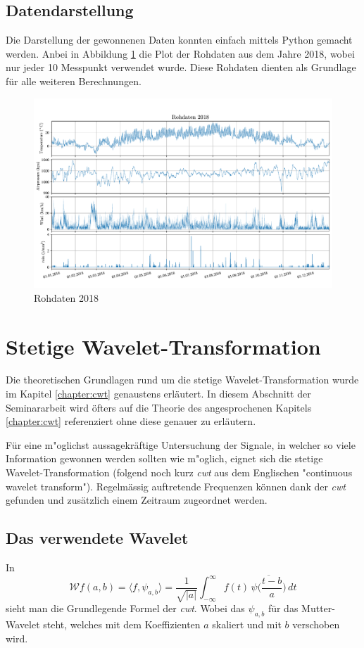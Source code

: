 \begin{refsection}
\subsection{Datendarstellung}
Die Darstellung der gewonnenen Daten konnten einfach mittels Python gemacht werden.
Anbei in Abbildung \ref{fig:rawdata} \space die Plot der Rohdaten aus dem Jahre 2018, wobei nur jeder 10 Messpunkt verwendet wurde.
Diese Rohdaten dienten als Grundlage für alle weiteren Berechnungen. 
\begin{figure}
	\centering
	\includegraphics[width=1\textwidth]{papers/wwt/images/raw.pdf}
	\caption{Rohdaten 2018}
	\label{fig:rawdata}
\end{figure}

\newpage
\section{Stetige Wavelet-Transformation}
Die theoretischen Grundlagen rund um die stetige Wavelet-Transformation wurde im Kapitel \ref{chapter:cwt} genaustens erläutert. 
In diesem Abschnitt der Seminararbeit wird öfters auf die Theorie des angesprochenen Kapitels \ref{chapter:cwt} referenziert ohne diese genauer zu erläutern. 

Für eine m"oglichst aussagekräftige Untersuchung der Signale, in welcher so viele Information gewonnen werden sollten wie m"oglich, eignet sich die stetige Wavelet-Transformation (folgend noch kurz \textit{cwt} aus dem Englischen "continuous wavelet transform"). 
Regelmässig auftretende Frequenzen können dank der \textit{cwt} gefunden und zusätzlich einem Zeitraum zugeordnet werden.
\subsection{Das verwendete Wavelet}
In
\begin{equation}
\mathcal{W}f (a,b)
=
\langle f,\psi_{a,b}\rangle
=
\frac{1}{\sqrt{|a|}}\int_{-\infty}^\infty f(t)\,\overline{
	\psi\biggl(\frac{t-b}{a}\biggr)}\,dt
\label{eq:cwt1}
\end{equation}
sieht man die Grundlegende Formel der \textit{cwt}.
Wobei das $\psi_{a,b}$ für das Mutter-Wavelet steht, welches mit dem Koeffizienten $a$ skaliert und mit $b$ verschoben wird.


\end{refsection}
